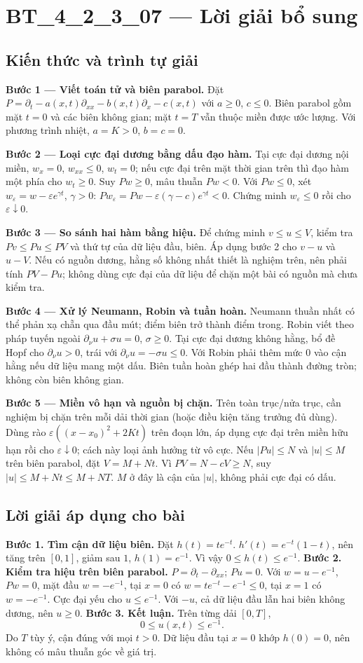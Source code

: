 \documentclass[10pt,a4paper]{article}
\begin{document}
\section*{BT\_4\_2\_3\_07 — Lời giải bổ sung}
\subsection*{Kiến thức và trình tự giải}
\textbf{Bước 1 — Viết toán tử và biên parabol.} Đặt $P=\partial_t-a(x,t)\partial_{xx}-b(x,t)\partial_x-c(x,t)$ với $a\ge0$, $c\le0$. Biên parabol gồm mặt $t=0$ và các biên không gian; mặt $t=T$ vẫn thuộc miền được ước lượng. Với phương trình nhiệt, $a=K>0$, $b=c=0$.

\textbf{Bước 2 — Loại cực đại dương bằng dấu đạo hàm.} Tại cực đại dương nội miền, $w_x=0$, $w_{xx}\le0$, $w_t=0$; nếu cực đại trên mặt thời gian trên thì đạo hàm một phía cho $w_t\ge0$. Suy $Pw\ge0$, mâu thuẫn $Pw<0$. Với $Pw\le0$, xét $w_\varepsilon=w-\varepsilon e^{\gamma t}$, $\gamma>0$: $Pw_\varepsilon=Pw-\varepsilon(\gamma-c)e^{\gamma t}<0$. Chứng minh $w_\varepsilon\le0$ rồi cho $\varepsilon\downarrow0$.

\textbf{Bước 3 — So sánh hai hàm bằng hiệu.} Để chứng minh $v\le u\le V$, kiểm tra $Pv\le Pu\le PV$ và thứ tự của dữ liệu đầu, biên. Áp dụng bước 2 cho $v-u$ và $u-V$. Nếu có nguồn dương, hằng số không nhất thiết là nghiệm trên, nên phải tính $PV-Pu$; không dùng cực đại của dữ liệu để chặn một bài có nguồn mà chưa kiểm tra.

\textbf{Bước 4 — Xử lý Neumann, Robin và tuần hoàn.} Neumann thuần nhất có thể phản xạ chẵn qua đầu mút; điểm biên trở thành điểm trong. Robin viết theo pháp tuyến ngoài $\partial_\nu u+\sigma u=0$, $\sigma\ge0$. Tại cực đại dương không hằng, bổ đề Hopf cho $\partial_\nu u>0$, trái với $\partial_\nu u=-\sigma u\le0$. Với Robin phải thêm mức $0$ vào cận hằng nếu dữ liệu mang một dấu. Biên tuần hoàn ghép hai đầu thành đường tròn; không còn biên không gian.

\textbf{Bước 5 — Miền vô hạn và nguồn bị chặn.} Trên toàn trục/nửa trục, cần nghiệm bị chặn trên mỗi dải thời gian (hoặc điều kiện tăng trưởng đủ dùng). Dùng rào $\varepsilon((x-x_0)^2+2Kt)$ trên đoạn lớn, áp dụng cực đại trên miền hữu hạn rồi cho $\varepsilon\downarrow0$; cách này loại ảnh hưởng từ vô cực. Nếu $|Pu|\le N$ và $|u|\le M$ trên biên parabol, đặt $V=M+Nt$. Vì $PV=N-cV\ge N$, suy $|u|\le M+Nt\le M+NT$. $M$ ở đây là cận của $|u|$, không phải cực đại có dấu.
\subsection*{Lời giải áp dụng cho bài}
\textbf{Bước 1. Tìm cận dữ liệu biên.} Đặt $h(t)=te^{-t}$. $h'(t)=e^{-t}(1-t)$, nên tăng trên $[0,1]$, giảm sau $1$, $h(1)=e^{-1}$. Vì vậy $0\le h(t)\le e^{-1}$.
\textbf{Bước 2. Kiểm tra hiệu trên biên parabol.} $P=\partial_t-\partial_{xx}$; $Pu=0$. Với $w=u-e^{-1}$, $Pw=0$, mặt đầu $w=-e^{-1}$, tại $x=0$ có $w=te^{-t}-e^{-1}\le0$, tại $x=1$ có $w=-e^{-1}$. Cực đại yếu cho $u\le e^{-1}$. Với $-u$, cả dữ liệu đầu lẫn hai biên không dương, nên $u\ge0$.
\textbf{Bước 3. Kết luận.} Trên từng dải $[0,T]$,
\[0\le u(x,t)\le e^{-1}.\]
Do $T$ tùy ý, cận đúng với mọi $t>0$. Dữ liệu đầu tại $x=0$ khớp $h(0)=0$, nên không có mâu thuẫn góc về giá trị.
\end{document}
